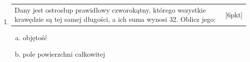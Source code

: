 \documentclass[12pt,a4paper]{article}
\begin{document}
\begin{enumerate}[1.]
		\item  \begin{tabular}{p{13cm} r}
			Dany jest ostrosłup prawidłowy czworokątny, którego wszystkie krawędzie są tej samej długości, a ich suma wynosi 32. Oblicz jego:&[6pkt]\\ 
		\end{tabular}
		\begin{enumerate}[a)]
			\item objętość
			\item pole powierzchni całkowitej
		\end{enumerate}
		
		
		
	\end{enumerate}
	
\end{document}
